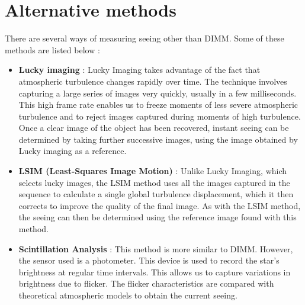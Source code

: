 \section{Alternative methods}
There are several ways of measuring seeing other than \Gls{DIMM}. Some of these methods are listed below :
\begin{itemize}
    \item \textbf{Lucky imaging} : Lucky Imaging takes advantage of the fact that atmospheric turbulence changes
          rapidly over time. The technique involves capturing a large series of images very quickly,
          usually in a few milliseconds. This high frame rate enables us to freeze moments of less severe atmospheric
          turbulence and to reject images captured during moments of high turbulence. Once a clear image of the object
          has been recovered, instant seeing can be determined by taking further successive images, using the image
          obtained by Lucky imaging as a reference.
    \item \textbf{LSIM (Least-Squares Image Motion)} : Unlike Lucky Imaging, which selects lucky images, the LSIM
          method uses all the images captured in the sequence to calculate a single global turbulence displacement,
          which it then corrects to improve the quality of the final image. As with the LSIM method, the seeing can then
          be determined using the reference image found with this method.
    \item \textbf{Scintillation Analysis} : This method is more similar to \Gls{DIMM}. However, the sensor used is a photometer.
          This device is used to record the star's brightness at regular time intervals. This allows us to capture variations
          in brightness due to flicker. The flicker characteristics are compared with theoretical atmospheric models
          to obtain the current seeing.
\end{itemize}